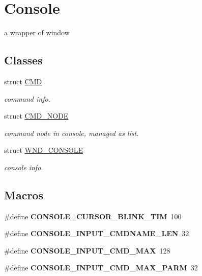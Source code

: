 \hypertarget{group__console}{}\section{Console}
\label{group__console}


a wrapper of window  


\subsection*{Classes}
\begin{DoxyCompactItemize}
\item 
struct \hyperlink{struct_c_m_d}{C\+M\+D}
\begin{DoxyCompactList}\small\item\em command info. \end{DoxyCompactList}\item 
struct \hyperlink{struct_c_m_d___n_o_d_e}{C\+M\+D\+\_\+\+N\+O\+D\+E}
\begin{DoxyCompactList}\small\item\em command node in console, managed as list. \end{DoxyCompactList}\item 
struct \hyperlink{struct_w_n_d___c_o_n_s_o_l_e}{W\+N\+D\+\_\+\+C\+O\+N\+S\+O\+L\+E}
\begin{DoxyCompactList}\small\item\em console info. \end{DoxyCompactList}\end{DoxyCompactItemize}
\subsection*{Macros}
\begin{DoxyCompactItemize}
\item 
\hypertarget{group__console_ga38da311ae2ef865d00636af539e99ad6}{}\#define {\bfseries C\+O\+N\+S\+O\+L\+E\+\_\+\+C\+U\+R\+S\+O\+R\+\_\+\+B\+L\+I\+N\+K\+\_\+\+T\+I\+M}~100\label{group__console_ga38da311ae2ef865d00636af539e99ad6}

\item 
\hypertarget{group__console_ga29502e1ba98695b65bd008acb6559b33}{}\#define {\bfseries C\+O\+N\+S\+O\+L\+E\+\_\+\+I\+N\+P\+U\+T\+\_\+\+C\+M\+D\+N\+A\+M\+E\+\_\+\+L\+E\+N}~32\label{group__console_ga29502e1ba98695b65bd008acb6559b33}

\item 
\hypertarget{group__console_ga954ba8f36483cc2de5600d7ffc2fb50e}{}\#define {\bfseries C\+O\+N\+S\+O\+L\+E\+\_\+\+I\+N\+P\+U\+T\+\_\+\+C\+M\+D\+\_\+\+M\+A\+X}~128\label{group__console_ga954ba8f36483cc2de5600d7ffc2fb50e}

\item 
\hypertarget{group__console_gab0a41d2846f556ee083332d32de1f53c}{}\#define {\bfseries C\+O\+N\+S\+O\+L\+E\+\_\+\+I\+N\+P\+U\+T\+\_\+\+C\+M\+D\+\_\+\+M\+A\+X\+\_\+\+P\+A\+R\+M}~32\label{group__console_gab0a41d2846f556ee083332d32de1f53c}

\end{DoxyCompactItemize}

